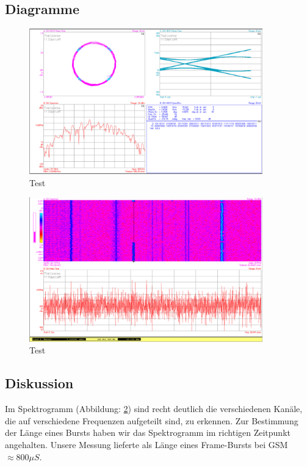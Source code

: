 \documentclass[12pt,a4paper,ngerman]{article}
\begin{document}
\subsection{Diagramme}
\begin{figure}[H]
\centering
\includegraphics[width=0.9\textwidth]{figures/Aufgabe4_demod.jpg} 
\caption{Test}
\label{fig:a4demod}
\end{figure}

\begin{figure}[H]
\centering
\includegraphics[width=0.9\textwidth]{figures/Aufgabe4_Spektrogramm.jpg} 
\caption{Test}
\label{fig:spectrogram}
\end{figure}




\subsection{Diskussion}

Im Spektrogramm (Abbildung: \ref{fig:spectrogram}) sind recht deutlich die verschiedenen Kanäle, die auf verschiedene Frequenzen aufgeteilt sind, zu erkennen. Zur Bestimmung der Länge eines Bursts haben wir das Spektrogramm im richtigen Zeitpunkt angehalten. Unsere Messung lieferte als Länge eines Frame-Bursts bei GSM $\approx 800 \mu S$. 
\end{document}
